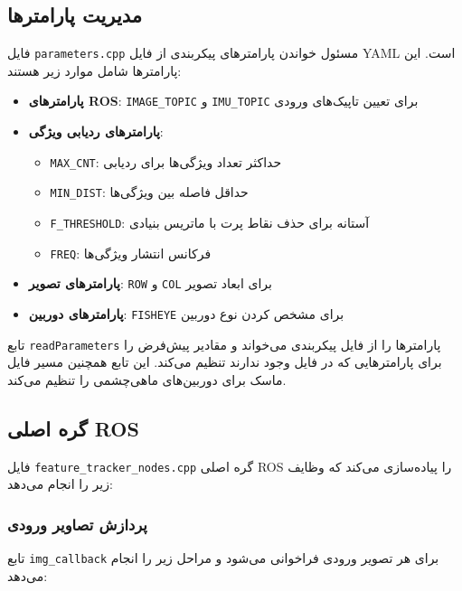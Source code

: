 \documentclass[11pt, a4paper]{article}
\begin{document}
	\subsection{مدیریت پارامترها}
	\label{subsec:parameter_management}
	
	فایل \texttt{parameters.cpp} مسئول خواندن پارامترهای پیکربندی از فایل YAML است. این پارامترها شامل موارد زیر هستند:
	
	\begin{itemize}
		\item \textbf{پارامترهای ROS}: \texttt{IMAGE\_TOPIC} و \texttt{IMU\_TOPIC} برای تعیین تاپیک‌های ورودی
		\item \textbf{پارامترهای ردیابی ویژگی}: 
		\begin{itemize}
			\item \texttt{MAX\_CNT}: حداکثر تعداد ویژگی‌ها برای ردیابی
			\item \texttt{MIN\_DIST}: حداقل فاصله بین ویژگی‌ها
			\item \texttt{F\_THRESHOLD}: آستانه برای حذف نقاط پرت با ماتریس بنیادی
			\item \texttt{FREQ}: فرکانس انتشار ویژگی‌ها
		\end{itemize}
		\item \textbf{پارامترهای تصویر}: \texttt{ROW} و \texttt{COL} برای ابعاد تصویر
		\item \textbf{پارامترهای دوربین}: \texttt{FISHEYE} برای مشخص کردن نوع دوربین
	\end{itemize}
	
	تابع \texttt{readParameters} پارامترها را از فایل پیکربندی می‌خواند و مقادیر پیش‌فرض را برای پارامترهایی که در فایل وجود ندارند تنظیم می‌کند. این تابع همچنین مسیر فایل ماسک برای دوربین‌های ماهی‌چشمی را تنظیم می‌کند.
	
	\subsection{گره اصلی ROS}
	\label{subsec:main_ros_node}
	
	فایل \texttt{feature\_tracker\_nodes.cpp} گره اصلی ROS را پیاده‌سازی می‌کند که وظایف زیر را انجام می‌دهد:
	
	\subsubsection{پردازش تصاویر ورودی}
	\label{subsubsec:image_processing}
	
	تابع \texttt{img\_callback} برای هر تصویر ورودی فراخوانی می‌شود و مراحل زیر را انجام می‌دهد:
	
\end{document}
